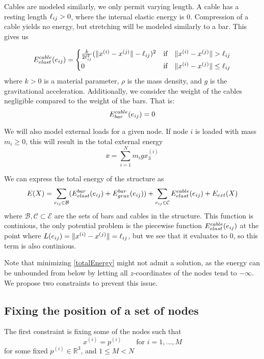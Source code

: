 Cables are modeled similarly, we only permit varying length. A cable has a resting length $\ell_{ij} > 0$, where the internal elastic energy is $0$. Compression of a cable yields no energy, but stretching will be modeled similarly to a bar. This gives us

\begin{equation}
E^{cable}_{elast}(e_{ij}) = \begin{cases}
    \frac{k}{2\ell_{ij}^2}(\lVert x^{(i)} - x^{(j)}\rVert-\ell_{ij})^2 & \text{if} \quad \lVert x^{(i)} - x^{(j)}\rVert >\ell_{ij}\\
    0 & \text{if} \quad \lVert x^{(i)} - x^{(j)}\rVert \leq \ell_{ij}
    \end{cases}
    \label{cableElast}
\end{equation}
where $k > 0$ is a material parameter, $\rho$ is the mass density, and $g$ is the gravitational acceleration. Additionally, we consider the weight of the cables negligible compared to the weight of the bars. That is:
\begin{equation}
    E^{cable}_{bar}(e_{ij}) = 0
    \label{cableGrav}
\end{equation}

We will also model external loads for a given node. If node $i$ is loaded with mass $m_i \geq 0$, this will result in the total external energy
\begin{equation}
    \ee = \sum_{i=1}^{N} m_i g x_3^{(i)}
    \label{externalEnergy}
\end{equation}

We can express the total energy of the structure as \begin{equation}
    E(X) = \sum\limits_{e_{ij} \in \mathcal{B}}(E^{bar}_{elast}(e_{ij}) + E^{bar}_{grav}(e_{ij})) + \sum\limits_{e_{ij} \in \mathcal{C}} E^{cable}_{elast}(e_{ij}) + E_{ext}(X)
    \label{totalEnergy}
\end{equation} where $\mathcal{B}, \mathcal{C} \subset \mathcal{E}$ are the sets of bars and cables in the structure. This function is continious, the only potential problem is the piecewise function $E^{cable}_{elast}(e_{ij})$ at the point where $L(e_{ij}) = \lVert x^{(i)} - x^{(j)}\rVert = \ell_{ij}$, but we see that it evaluates to $0$, so this term is also continious.

Note that minimizing \eqref{totalEnergy} might not admit a solution, as the energy can be unbounded from below by letting all $z$-coordinates of the nodes tend to $-\infty$. We propose two constraints to prevent this issue.

\subsection{Fixing the position of a set of nodes}
The first constraint is fixing some of the nodes such that
\begin{equation}
    x^{(i)} = p^{(i)} \qquad \text{for } i = 1,...,M
\end{equation} for some fixed $p^{(i)} \in \mathbb{R}^3$, and $1\leq M < N$

